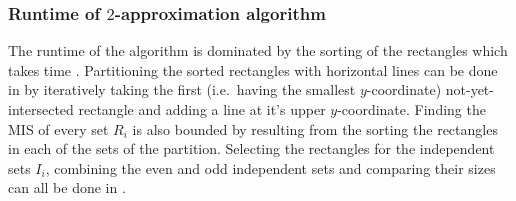 \subsubsection{Runtime of $2$-approximation algorithm}
The runtime of the algorithm is dominated by the sorting of the rectangles which takes time . Partitioning the sorted rectangles with horizontal lines can be done in  by iteratively taking the first (i.e.\ having the smallest $y$-coordinate) not-yet-intersected rectangle and adding a line at it's upper $y$-coordinate. Finding the MIS of every set $R_i$ is also bounded by  resulting from the sorting the rectangles in each of the sets of the partition. Selecting the rectangles for the independent sets $I_i$, combining the even and odd independent sets and comparing their sizes can all be done in .

